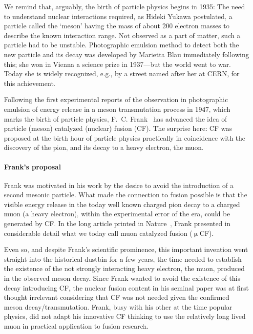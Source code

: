 \documentclass[particles,article,accept,pdftex,moreauthors]{Definitions/mdpi}
\begin{document}
We remind that, arguably, the birth of particle physics begins in 1935: The need to understand nuclear interactions required, as Hideki Yukawa postulated, a particle called the `meson' having the mass of about 200 electron masses to describe the known interaction range. Not observed as a part of matter, such a particle had to be unstable. Photographic emulsion method to detect both the new particle and its decay was developed by Marietta Blau immediately following this; she won in Vienna a science prize in 1937---but the world went to war. Today she is widely recognized, e.g., by a street named after her at CERN, for this achievement.

Following the first experimental reports of the observation in photographic emulsion of energy release in a meson transmutation process in 1947, which marks the birth of particle physics, F.~C. Frank~\cite{Frank:1947} has advanced the idea of particle (meson) catalyzed (nuclear) fusion (CF). The surprise here: CF was proposed at the birth hour of particle physics practically in coincidence with the discovery of the pion, and its decay to a heavy electron, the muon. 

\paragraph*{\bf Frank's proposal}
Frank was motivated in his work by the desire to avoid the introduction of a second mesonic particle. What made the connection to fusion possible is that the visible energy release in the today well known charged pion decay to a charged muon (a heavy electron), within the experimental error of the era, could be generated by CF. In the long article printed in Nature~\cite{Frank:1947}, Frank presented in considerable detail what we today call muon catalyzed fusion ($\upmu$CF). 

Even so, and despite Frank's scientific prominence, this important invention went straight into the historical dustbin for a few years, the time needed to establish the existence of the not strongly interacting heavy electron, the muon, produced in the observed meson decay. Since Frank wanted to avoid the existence of this decay introducing CF, the nuclear fusion content in his seminal paper was at first thought irrelevant considering that CF was not needed given the confirmed meson decay/transmutation. Frank, busy with his other at the time popular physics, did not adapt his innovative CF thinking to use the relatively long lived muon in practical application to fusion research.
\end{document}
